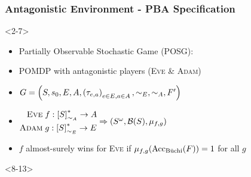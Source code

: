 \documentclass{beamer}
\newcommand{\adam}{\textsc{Adam}}
\newcommand{\eve}{\textsc{Eve}}
\begin{document}
  \begin{frame}
    \frametitle{Antagonistic Environment - \ac{PBA} Specification}
    \begin{overlayarea}{\textwidth}{0.2\textheight}
    \end{overlayarea}
    \begin{overlayarea}{\textwidth}{0.8\textheight}
      \begin{onlyenv}<2-7>
        \begin{itemize}
          \item Partially Observable Stochastic Game (\ac{POSG}):
          \item<3-> \ac{POMDP} with antagonistic players (\eve{} \& \adam{})
          \item<4-> $G = \left(S, s_{0}, E, A,
            \left(\tau_{e,a}\right)_{e\in E, a\in A}, \sim_{E}, \sim_{A}, F'\right)$
          \item<5-> 
            $\begin{aligned}
              \eve{}\; &f:\interval{S}_{\sim_{A}}^{*}\rightarrow A\\
              \adam{}\; &g:\interval{S}_{\sim_{E}}^{*}\rightarrow E
            \end{aligned} \Rightarrow \tuple{S^{\omega}, \mathcal{B}(S), 
            \mu_{f,g}}$
          \item<6-> $f$ almost-surely wins for \eve{} if
            $\mu_{f,g}(\operatorname{Acc}_{\operatorname{B\ddot{u}chi}}(F)) = 1$ for all $g$
        \end{itemize}
      \end{onlyenv}
      \begin{onlyenv}<8-13>
\end{onlyenv}
\end{overlayarea}
\end{frame}
\end{document}
